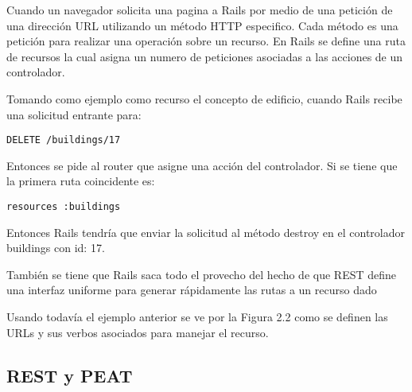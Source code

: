 Cuando un navegador solicita una pagina a Rails por medio de una petición de una
dirección URL utilizando un método HTTP especifico. Cada método es una petición
para realizar una operación sobre un recurso. En Rails se define una ruta de
recursos la cual asigna un numero de peticiones asociadas a las acciones de
un controlador.

Tomando como ejemplo como recurso el concepto de edificio, cuando Rails recibe una
solicitud entrante para:

\begin{verbatim}
DELETE /buildings/17
\end{verbatim}

Entonces se pide al router que asigne una acción del controlador. Si se tiene
que la primera ruta coincidente es:

\begin{verbatim}
resources :buildings
\end{verbatim}

Entonces Rails tendría que enviar la solicitud al método destroy en el controlador
buildings con {id: 17}.

También se tiene que Rails saca todo el provecho del hecho de que REST define
una interfaz uniforme para generar rápidamente las rutas a un recurso dado

Usando todavía el ejemplo anterior se ve por la Figura 2.2 como se definen
las URLs y sus verbos asociados para manejar el recurso.


\subsection{REST y PEAT}
